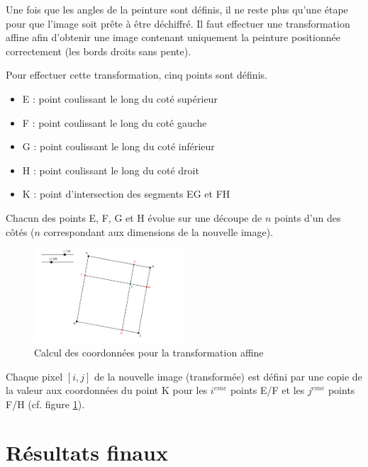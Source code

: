 \documentclass[a4paper]{article}
\begin{document}
        Une fois que les angles de la peinture sont définis, il ne reste plus qu'une étape pour que l'image soit prête à être déchiffré. Il faut effectuer une transformation affine afin d'obtenir une image contenant uniquement la peinture positionnée correctement (les bords droits sans pente).

        Pour effectuer cette transformation, cinq points sont définis.
        \begin{itemize}
            \item E : point coulissant le long du coté supérieur
            \item F : point coulissant le long du coté gauche
            \item G : point coulissant le long du coté inférieur
            \item H : point coulissant le long du coté droit
            \item K : point d'intersection des segments EG et FH
        \end{itemize}

        Chacun des points E, F, G et H évolue sur une découpe de $n$ points d'un des côtés ($n$ correspondant aux dimensions de la nouvelle image).

        \begin{figure}[htbp]
            \begin{center}
                \includegraphics[width=0.5\textwidth]{rsc/formule.png}
                \caption{Calcul des coordonnées pour la transformation affine}
                \label{fig:transform}
            \end{center}
        \end{figure}

        Chaque pixel $[i,j]$ de la nouvelle image (transformée) est défini par une copie de la valeur aux coordonnées du point K pour les $i^{eme}$ points E/F et les $j^{eme}$ points F/H (cf. figure \ref{fig:transform}).

    \section{Résultats finaux}
\end{document}
